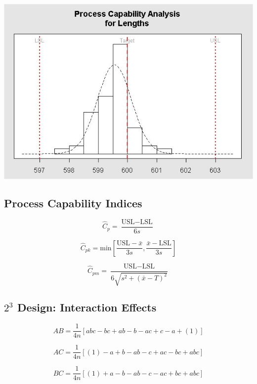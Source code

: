 \documentclass[a4paper,12pt]{article}
\begin{document}
\begin{itemize}
	\begin{center}
		\includegraphics[scale=0.55]{image/ExamQ4hist}
	\end{center}
	\newpage
\end{itemize}



\subsection*{Process Capability Indices}
\[ \hat{C}_p = \frac{\mbox{USL} - \mbox{LSL}}{6s}\]

\[ \hat{C}_{pk} = \mbox{min} \left[\frac{\mbox{USL} - \bar{x}}{3s},\frac{\bar{x} - \mbox{LSL}}{3s} \right] \]

\[ \hat{C}_{pm} = \frac{\mbox{USL} - \mbox{LSL}}{6\sqrt{s^2+(\bar{x}-T)^2}}\]
\bigskip
%
\subsection*{$2^3$ Design: Interaction Effects}

\[ AB = \frac{1}{4n} \left[ abc - bc + ab - b - ac + c - a + (1) \right] \]

\[ AC = \frac{1}{4n} \left[ (1) - a + b - ab -c + ac - bc + abc \right] \]

\[ BC = \frac{1}{4n} \left[ (1) + a - b - ab - c - ac + bc + abc \right] \]
\end{document}
